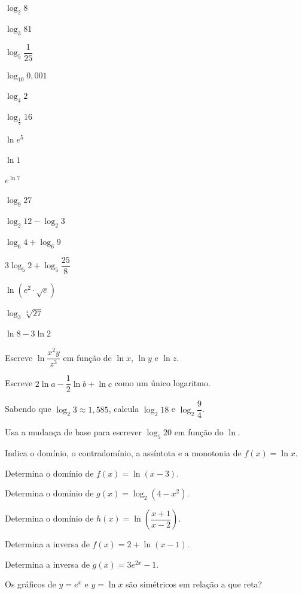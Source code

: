 \documentclass[12pt]{article}
\begin{document}


\begin{exercicios}
  \item $\log_2 8$
  \item $\log_3 81$
  \item $\log_5 \dfrac{1}{25}$
  \item $\log_{10} 0{,}001$
  \item $\log_4 2$
  \item $\log_{\frac{1}{2}} 16$
  \item $\ln e^5$
  \item $\ln 1$
  \item $e^{\ln 7}$
  \item $\log_9 27$
\end{exercicios}

\begin{exercicios}
  \item $\log_2 12 - \log_2 3$
  \item $\log_6 4 + \log_6 9$
  \item $3\log_5 2 + \log_5 \dfrac{25}{8}$
  \item $\ln(e^2 \cdot \sqrt{e})$
  \item $\log_3 \sqrt[4]{27}$
  \item $\ln 8 - 3\ln 2$
  \item Escreve $\ln\dfrac{x^2 y}{z^3}$ em função de $\ln x$, $\ln y$ e $\ln z$.
  \item Escreve $2\ln a - \dfrac{1}{2}\ln b + \ln c$ como um único logaritmo.
  \item Sabendo que $\log_2 3 \approx 1{,}585$, calcula $\log_2 18$ e $\log_2 \dfrac{9}{4}$.
  \item Usa a mudança de base para escrever $\log_5 20$ em função do $\ln$.
\end{exercicios}

\begin{exercicios}
  \item Indica o domínio, o contradomínio, a assíntota e a monotonia de $f(x) = \ln x$.
  \item Determina o domínio de $f(x) = \ln(x - 3)$.
  \item Determina o domínio de $g(x) = \log_2(4 - x^2)$.
  \item Determina o domínio de $h(x) = \ln\left(\dfrac{x + 1}{x - 2}\right)$.
  \item Determina a inversa de $f(x) = 2 + \ln(x - 1)$.
  \item Determina a inversa de $g(x) = 3e^{2x} - 1$.
  \item Os gráficos de $y = e^x$ e $y = \ln x$ são simétricos em relação a que reta?
\end{exercicios}
\end{document}
